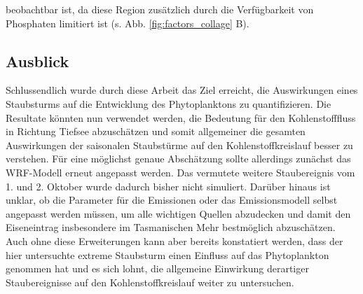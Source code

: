 \documentclass[12pt,a4paper,onecolumn]{scrartcl}
\begin{document}
beobachtbar ist, da diese Region zusätzlich durch die Verfügbarkeit von Phosphaten limitiert ist (s. Abb. \ref{fig:factors_collage} B).
\subsection{Ausblick}
Schlussendlich wurde durch diese Arbeit das Ziel erreicht, die Auswirkungen eines Staubsturms auf die Entwicklung des Phytoplanktons zu quantifizieren. Die Resultate könnten nun verwendet werden, die Bedeutung für den Kohlenstofffluss in Richtung Tiefsee abzuschätzen und somit allgemeiner die gesamten Auswirkungen der saisonalen Staubstürme auf den Kohlenstoffkreislauf besser zu verstehen. Für eine möglichst genaue Abschätzung sollte allerdings zunächst das WRF-Modell erneut angepasst werden. Das vermutete weitere Staubereignis vom 1. und 2. Oktober wurde dadurch bisher nicht simuliert. Darüber hinaus ist unklar, ob die Parameter für die Emissionen oder das Emissionsmodell selbst angepasst werden müssen, um alle wichtigen Quellen abzudecken und damit den Eiseneintrag insbesondere im Tasmanischen Mehr bestmöglich abzuschätzen. Auch ohne diese Erweiterungen kann aber bereits konstatiert werden, dass der hier untersuchte extreme Staubsturm einen Einfluss auf das Phytoplankton genommen hat und es sich lohnt, die allgemeine Einwirkung derartiger Staubereignisse auf den Kohlenstoffkreislauf weiter zu untersuchen.

\newpage
\begin{singlespace} %
\printbibliography
\end{singlespace}
\appendix

\newpage
\end{document}
